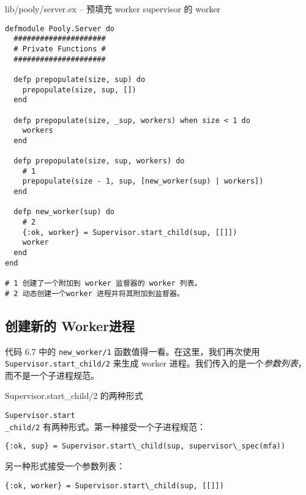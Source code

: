 \begin{code}{lib/pooly/server.ex -- 预填充 worker supervisor 的 worker}

\begin{verbatim}
defmodule Pooly.Server do
  #####################
  # Private Functions #
  #####################

  defp prepopulate(size, sup) do
    prepopulate(size, sup, [])
  end

  defp prepopulate(size, _sup, workers) when size < 1 do
    workers
  end

  defp prepopulate(size, sup, workers) do
    # 1
    prepopulate(size - 1, sup, [new_worker(sup) | workers])
  end

  defp new_worker(sup) do
    # 2
    {:ok, worker} = Supervisor.start_child(sup, [[]])
    worker
  end
end

# 1 创建了一个附加到 worker 监督器的 worker 列表。 
# 2 动态创建一个worker 进程并将其附加到监督器。
\end{verbatim}
\end{code}




\subsection{创建新的 Worker进程}

代码 6.7 中的 \texttt{new\_worker/1}
函数值得一看。在这里，我们再次使用
\texttt{Supervisor.start\_child/2} 来生成 worker
进程。我们传入的是一个\emph{参数列表}，而不是一个子进程规范。

Supervisor.start\_child/2 的两种形式

\texttt{Supervisor.start\\\_child/2}
有两种形式。第一种接受一个子进程规范：

\begin{code}{}
\begin{verbatim}
{:ok, sup} = Supervisor.start\_child(sup, supervisor\_spec(mfa))
\end{verbatim}
\end{code}

另一种形式接受一个参数列表：

\begin{code}{}
\begin{verbatim}
{:ok, worker} = Supervisor.start\_child(sup, [[]])
\end{verbatim}
\end{code}

